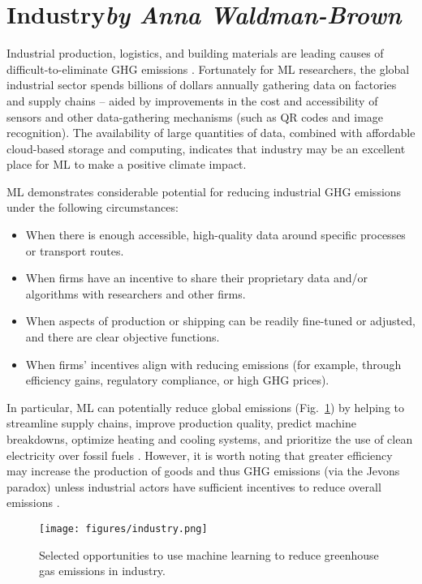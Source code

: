 \documentclass[11pt]{report}
\begin{document}
\section{Industry\texorpdfstring{\hfill\textit{by Anna Waldman-Brown}}{}}
\label{sec:industry}
Industrial production, logistics, and building materials are leading causes of difficult-to-eliminate GHG emissions \cite{Daviseaas9793}. Fortunately for ML researchers, the global industrial sector spends billions of dollars annually gathering data on factories and supply chains \cite{Gualtieri2016} -- aided by improvements in the cost and accessibility of sensors and other data-gathering mechanisms (such as QR codes and image recognition). The availability of large quantities of data, combined with affordable cloud-based storage and computing, indicates that industry may be an excellent place for ML to make a positive climate impact. 

ML demonstrates considerable potential for reducing industrial GHG emissions under the following circumstances:
\begin{itemize}
    \item When there is enough accessible, high-quality data around specific processes or transport routes.
    \item When firms have an incentive to share their proprietary data and/or algorithms with researchers and other firms.
    \item When aspects of production or shipping can be readily fine-tuned or adjusted, and there are clear objective functions.
    \item When firms' incentives align with reducing emissions (for example, through efficiency gains, regulatory compliance, or high GHG prices).
\end{itemize}
In particular, ML can potentially reduce global emissions (Fig.~\ref{fig:industry}) by helping to streamline supply chains, improve production quality, predict machine breakdowns, optimize heating and cooling systems, and prioritize the use of clean electricity over fossil fuels \cite{kazi2017dreamsketch, evans2016deepmind, Zhang2016, Berral2010}.
However, it is worth noting that greater efficiency may increase the production of goods and thus GHG emissions (via the Jevons paradox) unless industrial actors have sufficient incentives to reduce overall emissions \cite{sorrell2009jevons}.

\begin{figure}[bpht]
    \centering
    \texttt{[image: figures/industry.png]}
    \caption{Selected opportunities to use machine learning to reduce greenhouse gas emissions in industry.}
    \label{fig:industry}
\end{figure}
\end{document}
